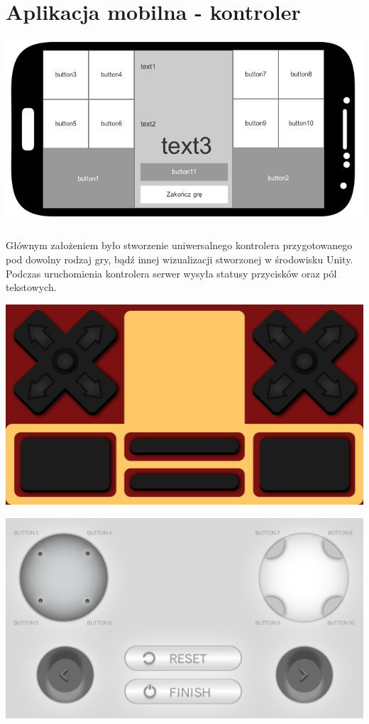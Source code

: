\newpage
\section{Aplikacja mobilna - kontroler}

\begin{center}
\includegraphics[width=1\textwidth]{images/button_mockup.png}
\end{center}
\paragraph{}
Głównym założeniem było stworzenie uniwersalnego kontrolera przygotowanego pod dowolny rodzaj gry, bądź innej wizualizacji stworzonej w środowisku Unity. Podczas uruchomienia kontrolera serwer wysyła statusy przycisków oraz pól tekstowych.


\begin{center}
\includegraphics[width=1\textwidth]{images/graph1.png}

\includegraphics[width=1\textwidth]{images/graph2.png}
\end{center}

